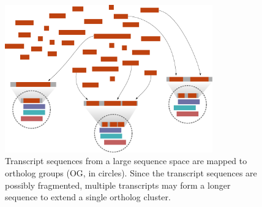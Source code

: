 \begin{figure}[h]
	\centering
	\includegraphics[width=0.8\textwidth]{img/graph.pdf}
	\caption[Clusters of ortholog groups]{
		Transcript sequences from a large sequence space are mapped to ortholog
		groups (OG, in circles). Since the transcript sequences are possibly
		fragmented, multiple transcripts may form a longer sequence to extend a
		single ortholog cluster.
	}
	\label{fig:graph}
\end{figure}


